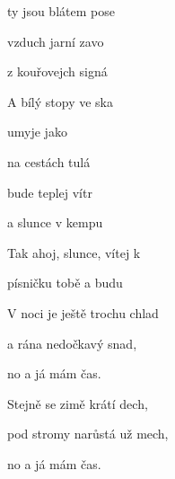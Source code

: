 
\zs
{}ty jsou blátem pose

vzduch jarní  zavo

z kouřovejch signá

A bílý stopy ve ska

umyje  jako 

na cestách tulá
\ks

\zr
{} bude teplej vítr 

a slunce  v kempu 

Tak ahoj, slunce, vítej k 

písničku  tobě  a budu 
\kr



\zs
V noci je ještě trochu chlad

a rána nedočkavý snad,

no a já mám čas.

Stejně se zimě krátí dech,

pod stromy narůstá už mech,

no a já mám čas.
\ks

\zr \kr
\zr \kr

\kp







